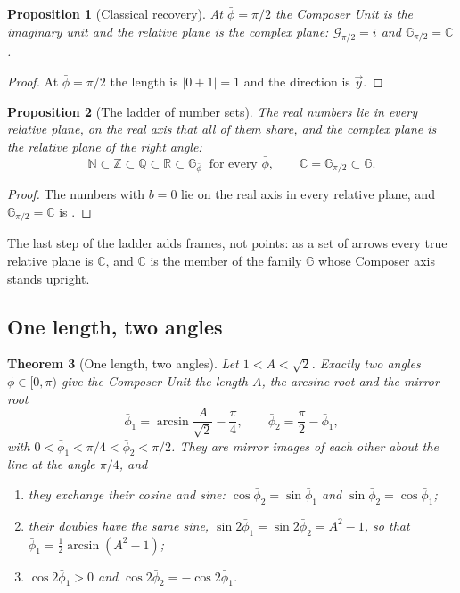 \documentclass[11pt,a4paper]{amsart}
\theoremstyle{plain}
\newtheorem{theorem}{Theorem}[section]
\newtheorem{proposition}[theorem]{Proposition}
\theoremstyle{definition}
\theoremstyle{remark}
\newcommand{\pb}{\bar{\phi}}                     %
\newcommand{\GN}{\mathbb{G}}                     %
\newcommand{\GNp}{\mathbb{G}_{\bar{\phi}}}       %
\newcommand{\C}{\mathbb{C}}
\newcommand{\R}{\mathbb{R}}
\begin{document}
\begin{proposition}[Classical recovery]\label{thm:classical-recovery}
At $\pb = \pi/2$ the Composer Unit is the imaginary unit and the relative plane is the complex plane: $\mathcal{G}_{\pi/2} = i$ and $\mathbb{G}_{\pi/2} = \C$.
\end{proposition}

\begin{proof}
At $\pb = \pi/2$ the length is $\lvert 0 + 1\rvert = 1$ and the direction is $\vec{y}$.
\end{proof}

\begin{proposition}[The ladder of number sets]\label{prop:ladder}
The real numbers lie in every relative plane, on the real axis that all of them share, and the complex plane is the relative plane of the right angle:
\[
\mathbb{N} \subset \mathbb{Z} \subset \mathbb{Q} \subset \R \subset \GNp \ \text{ for every } \pb , \qquad \C = \mathbb{G}_{\pi/2} \subset \GN .
\]
\end{proposition}

\begin{proof}
The numbers with $b = 0$ lie on the real axis in every relative plane, and $\mathbb{G}_{\pi/2} = \C$ is .
\end{proof}

The last step of the ladder adds frames, not points: as a set of arrows every true relative plane is $\C$, and $\C$ is the member of the family $\GN$ whose Composer axis stands upright.

\subsection{One length, two angles}\label{subsec:two-roots}

\begin{theorem}[One length, two angles]\label{thm:two-roots}
Let $1 < A < \sqrt{2}$. Exactly two angles $\pb \in [0, \pi)$ give the Composer Unit the length $A$, the \emph{arcsine root} and the \emph{mirror root}
\[
\pb_1 = \arcsin\frac{A}{\sqrt{2}} - \frac{\pi}{4} , \qquad \pb_2 = \frac{\pi}{2} - \pb_1 ,
\]
with $0 < \pb_1 < \pi/4 < \pb_2 < \pi/2$. They are mirror images of each other about the line at the angle $\pi/4$, and
\begin{enumerate}
  \item they exchange their cosine and sine: $\cos\pb_2 = \sin\pb_1$ and $\sin\pb_2 = \cos\pb_1$;
  \item their doubles have the same sine, $\sin 2\pb_1 = \sin 2\pb_2 = A^2 - 1$, so that $\pb_1 = \tfrac{1}{2}\arcsin(A^2 - 1)$;
  \item $\cos 2\pb_1 > 0$ and $\cos 2\pb_2 = -\cos 2\pb_1$.
\end{enumerate}
\end{theorem}
\end{document}
